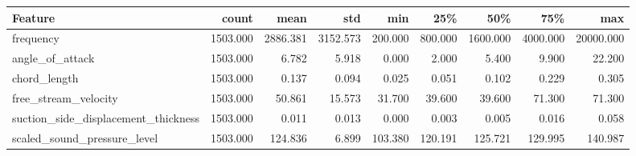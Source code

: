 \begin{tabular}{lrrrrrrrr}
\toprule
Feature & count & mean & std & min & 25\% & 50\% & 75\% & max \\
\midrule
frequency & 1503.000 & 2886.381 & 3152.573 & 200.000 & 800.000 & 1600.000 & 4000.000 & 20000.000 \\
angle\_of\_attack & 1503.000 & 6.782 & 5.918 & 0.000 & 2.000 & 5.400 & 9.900 & 22.200 \\
chord\_length & 1503.000 & 0.137 & 0.094 & 0.025 & 0.051 & 0.102 & 0.229 & 0.305 \\
free\_stream\_velocity & 1503.000 & 50.861 & 15.573 & 31.700 & 39.600 & 39.600 & 71.300 & 71.300 \\
suction\_side\_displacement\_thickness & 1503.000 & 0.011 & 0.013 & 0.000 & 0.003 & 0.005 & 0.016 & 0.058 \\
scaled\_sound\_pressure\_level & 1503.000 & 124.836 & 6.899 & 103.380 & 120.191 & 125.721 & 129.995 & 140.987 \\
\bottomrule
\end{tabular}